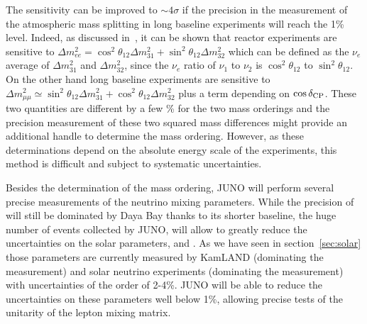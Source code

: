 The sensitivity can be improved to $\sim4\sigma$ if the precision in the measurement of the atmospheric mass splitting in long baseline experiments will reach the 1\% level. Indeed, as discussed in~\cite{nunokawa,parkemee}, it can be shown that reactor experiments are sensitive to 
$\Delta m^2_{ee} = \cos^2 \theta_{12} \Delta m^2_{31} + \sin^2 \theta_{12} \Delta m^2_{32}$ which can be defined as 
the $\nu_e$ average of $\Delta m^2_{31}$ and $\Delta m^2_{32}$, since the $\nu_e$ ratio of $\nu_1$ to $\nu_2$
is $\cos^2 \theta_{12}$ to $\sin^2 \theta_{12}$.
On the other hand long baseline experiments are sensitive to 
$\Delta m^2_{\mu \mu} \simeq \sin^2 \theta_{12} \Delta m^2_{31} + \cos^2 \theta_{12} \Delta m^2_{32}$ plus a term depending on $\cos \delta_{\mathrm{CP}}$. These two quantities are different by a few \% for the two mass orderings and the precision measurement of these two squared mass differences might provide an additional handle to determine the mass ordering. However, as these determinations depend on the absolute energy scale of the experiments, this method is difficult and subject to systematic uncertainties. 




Besides the determination of the mass ordering, JUNO will perform several precise measurements of the neutrino mixing parameters. While the precision of \thint will still be dominated by Daya Bay thanks to its shorter baseline, the huge number of events collected by JUNO, will allow to greatly reduce the uncertainties on the solar parameters, \thsol and \dmsqso. As we have seen in section~\ref{sec:solar} those parameters are currently measured by KamLAND (dominating the \dmsqso measurement) and solar neutrino experiments (dominating the \thsol measurement) with uncertainties of the order of 2-4\%. JUNO will be able to reduce the uncertainties on these parameters well below 1\%, allowing precise tests of the unitarity of the lepton mixing matrix.

